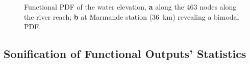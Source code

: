 \begin{figure}[!h]               
\centering
{}
\caption{Functional PDF of the water elevation, \textbf{a} along the 463 nodes along the river reach; \textbf{b} at Marmande station (36~km) revealing a bimodal PDF.}
\label{fig:pdf_MASCARET}
\end{figure}

\subsection{Sonification of Functional Outputs' Statistics}
\label{subsec:sound}

